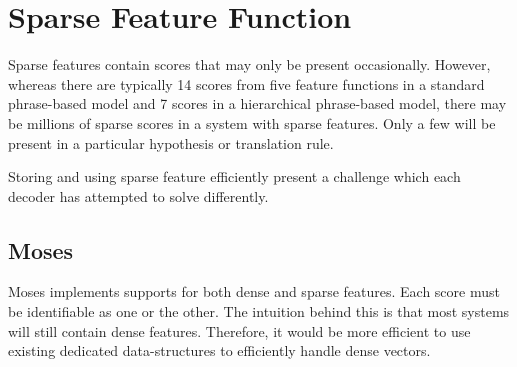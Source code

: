 \documentclass{pbml}
\begin{document}
% 


\section{Sparse Feature Function}

Sparse features contain scores that may only be present occasionally. However, whereas there are typically 14 scores from five feature functions in a standard phrase-based model and 7 scores in a hierarchical phrase-based model, there may be millions of sparse scores in a system with sparse features. Only a few will be present in a particular hypothesis or translation rule.

Storing and using sparse feature efficiently present a challenge which each decoder has attempted to solve differently.

\subsection{Moses}
Moses implements supports for both dense and sparse features. Each score must be identifiable as one or the other.
The intuition behind this is that most systems will still contain dense features. Therefore, it would be more efficient to use existing dedicated data-structures to efficiently handle dense vectors.
\end{document}
